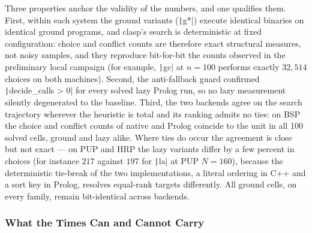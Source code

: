 Three properties anchor the validity of the numbers, and one qualifies them. First, within each system the ground variants (\texttt|g*|) execute identical binaries on identical ground programs, and clasp's search is deterministic at fixed configuration: choice and conflict counts are therefore exact structural measures, not noisy samples, and they reproduce bit-for-bit the counts observed in the preliminary local campaign (for example, \texttt|gc| at $n=100$ performs exactly $32{,}514$ choices on both machines). Second, the anti-fallback guard confirmed \texttt|decide_calls > 0| for every solved lazy Prolog run, so no lazy measurement silently degenerated to the baseline. Third, the two backends agree on the search trajectory wherever the heuristic is total and its ranking admits no ties: on BSP the choice and conflict counts of native and Prolog coincide to the unit in all 100 solved cells, ground and lazy alike. Where ties do occur the agreement is close but not exact --- on PUP and HRP the lazy variants differ by a few percent in choices (for instance $217$ against $197$ for \texttt|la| at PUP $N=160$), because the deterministic tie-break of the two implementations, a literal ordering in C++ and a sort key in Prolog, resolves equal-rank targets differently. All ground cells, on every family, remain bit-identical across backends.

\subsubsection{What the Times Can and Cannot Carry}
\label{sec:node-variance}

